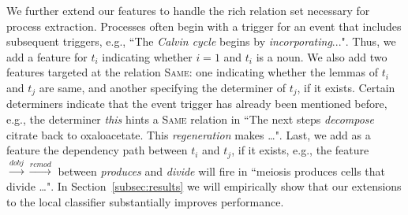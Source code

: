 
We further extend our features to handle the rich relation set necessary for process extraction. Processes often begin with a trigger for an event that includes subsequent triggers, e.g., ``The \emph{Calvin cycle} begins by \emph{incorporating}...". Thus, we add a feature for $t_i$ indicating whether $i=1$ and $t_i$  is a noun. We also add two features targeted at the relation \textsc{Same}: one indicating whether the lemmas of $t_i$ and $t_j$ are same, and another specifying the determiner of $t_j$, if it exists. Certain determiners indicate that the event trigger has already been mentioned before, e.g., the determiner \emph{this} hints a \textsc{Same} relation in ``The next steps \emph{decompose} citrate back to oxaloacetate. This \emph{regeneration} makes \ldots". Last, we add as a feature the dependency path between $t_i$ and $t_j$, if it exists, e.g., the feature $\xrightarrow{\scriptscriptstyle dobj} \xrightarrow{\scriptscriptstyle rcmod}$ between \emph{produces} and \emph{divide} will fire in ``meiosis produces cells that divide \ldots". In Section~\ref{subsec:results} we will empirically show that our extensions to the local classifier substantially improves performance.

